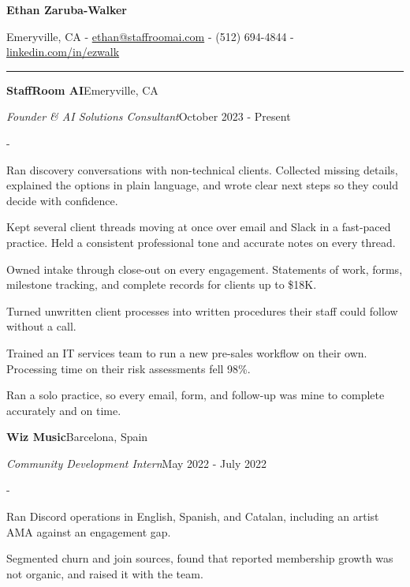 \documentclass[10pt,letterpaper]{article}
\newenvironment{cvitems}{%
  \begin{list}{-}{%
    \setlength{\leftmargin}{12pt}%
    \setlength{\itemsep}{1.2pt}%
    \setlength{\parsep}{0pt}%
    \setlength{\topsep}{1.5pt}%
    \setlength{\partopsep}{0pt}%
    \setlength{\labelwidth}{6pt}%
    \setlength{\labelsep}{6pt}%
    \setlength{\itemindent}{0pt}%
  }%
}{\end{list}}
\newcommand{\cvsection}[1]{%
  \vspace{7pt}%
  \noindent{\bfseries\fontsize{11pt}{13pt}\selectfont\MakeUppercase{#1}}\par
  \vspace{1pt}%
  \noindent\rule{\textwidth}{0.4pt}\par
  \vspace{4pt}%
}
\newcommand{\cventryhead}[4]{%
  \noindent\textbf{#1}\hfill#2\par
  \vspace{0.5pt}%
  \noindent\textit{#3}\hfill#4\par
}
\begin{document}
\begin{center}
  {\bfseries\fontsize{22pt}{24pt}\selectfont Ethan Zaruba-Walker\par}
  \vspace{4pt}
  {\fontsize{10pt}{12pt}\selectfont
    Emeryville, CA
    {-}
    \href{mailto:ethan@staffroomai.com}{ethan@staffroomai.com}
    {-}
    (512) 694-4844
    {-}
    \href{https://linkedin.com/in/ezwalk}{linkedin.com/in/ezwalk}\par}
\end{center}
\vspace{2pt}

\cvsection{Experience}

\cventryhead{StaffRoom AI}{Emeryville, CA}
{Founder \& AI Solutions Consultant}{October 2023 - Present}
\begin{cvitems}
  \item Ran discovery conversations with non-technical clients. Collected missing details, explained the options in plain language, and wrote clear next steps so they could decide with confidence.
  \item Kept several client threads moving at once over email and Slack in a fast-paced practice. Held a consistent professional tone and accurate notes on every thread.
  \item Owned intake through close-out on every engagement. Statements of work, forms, milestone tracking, and complete records for clients up to \$18K.
  \item Turned unwritten client processes into written procedures their staff could follow without a call.
  \item Trained an IT services team to run a new pre-sales workflow on their own. Processing time on their risk assessments fell 98\%.
  \item Ran a solo practice, so every email, form, and follow-up was mine to complete accurately and on time.
\end{cvitems}

\vspace{5pt}
\cventryhead{Wiz Music}{Barcelona, Spain}
{Community Development Intern}{May 2022 - July 2022}
\begin{cvitems}
  \item Ran Discord operations in English, Spanish, and Catalan, including an artist AMA against an engagement gap.
  \item Segmented churn and join sources, found that reported membership growth was not organic, and raised it with the team.
\end{cvitems}
\end{document}
